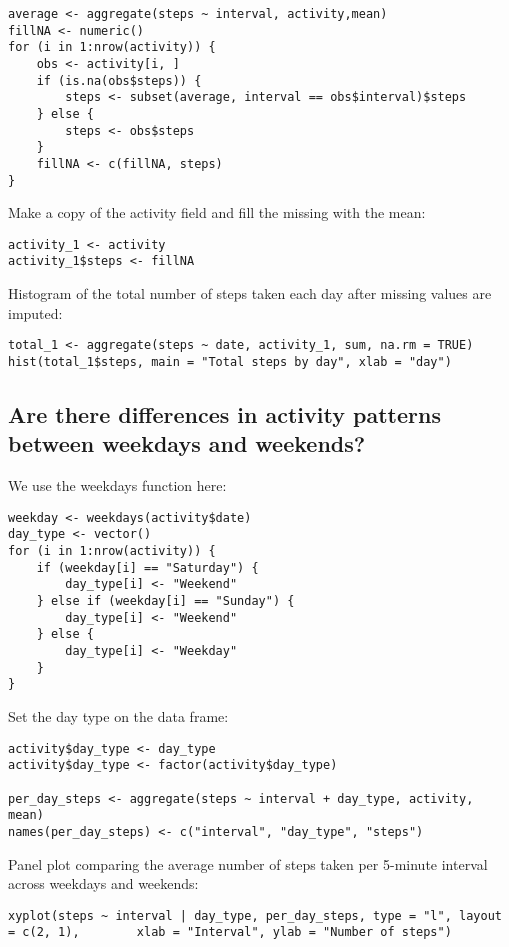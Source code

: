 \documentclass[
]{article}
\begin{document}
\begin{verbatim}
average <- aggregate(steps ~ interval, activity,mean)
fillNA <- numeric()
for (i in 1:nrow(activity)) {
    obs <- activity[i, ]
    if (is.na(obs$steps)) {
        steps <- subset(average, interval == obs$interval)$steps
    } else {
        steps <- obs$steps
    }
    fillNA <- c(fillNA, steps)
}
\end{verbatim}

Make a copy of the activity field and fill the missing with the mean:

\begin{verbatim}
activity_1 <- activity
activity_1$steps <- fillNA
\end{verbatim}

Histogram of the total number of steps taken each day after missing
values are imputed:

\begin{verbatim}
total_1 <- aggregate(steps ~ date, activity_1, sum, na.rm = TRUE)
hist(total_1$steps, main = "Total steps by day", xlab = "day")
\end{verbatim}

\hypertarget{are-there-differences-in-activity-patterns-between-weekdays-and-weekends}{%
\subsection{Are there differences in activity patterns between weekdays
and
weekends?}\label{are-there-differences-in-activity-patterns-between-weekdays-and-weekends}}

We use the weekdays function here:

\begin{verbatim}
weekday <- weekdays(activity$date)
day_type <- vector()
for (i in 1:nrow(activity)) {
    if (weekday[i] == "Saturday") {
        day_type[i] <- "Weekend"
    } else if (weekday[i] == "Sunday") {
        day_type[i] <- "Weekend"
    } else {
        day_type[i] <- "Weekday"
    }
}
\end{verbatim}

Set the day type on the data frame:

\begin{verbatim}
activity$day_type <- day_type
activity$day_type <- factor(activity$day_type)

per_day_steps <- aggregate(steps ~ interval + day_type, activity, mean)
names(per_day_steps) <- c("interval", "day_type", "steps")
\end{verbatim}

Panel plot comparing the average number of steps taken per 5-minute
interval across weekdays and weekends:

\begin{verbatim}
xyplot(steps ~ interval | day_type, per_day_steps, type = "l", layout = c(2, 1),        xlab = "Interval", ylab = "Number of steps")
\end{verbatim}
\end{document}
